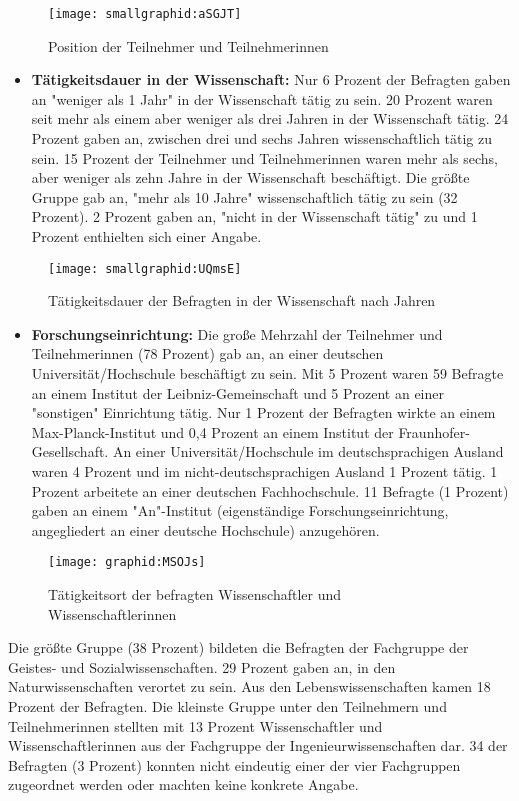 \begin{figure}[h!]
\texttt{[image: smallgraphid:aSGJT]}
\caption{Position der Teilnehmer und Teilnehmerinnen}
\end{figure}

\begin{itemize}
\item \textbf{Tätigkeitsdauer in der Wissenschaft:} Nur 6 Prozent der Befragten gaben an "weniger als 1 Jahr" in der Wissenschaft tätig zu sein. 20 Prozent waren seit mehr als einem aber weniger als drei Jahren in der Wissenschaft tätig. 24 Prozent gaben an, zwischen drei und sechs Jahren wissenschaftlich tätig zu sein. 15 Prozent der Teilnehmer und Teilnehmerinnen waren mehr als sechs, aber weniger als zehn Jahre in der Wissenschaft beschäftigt. Die größte Gruppe gab an, "mehr als 10 Jahre" wissenschaftlich tätig zu sein (32 Prozent). 2 Prozent gaben an, "nicht in der Wissenschaft tätig" zu und 1 Prozent enthielten sich einer Angabe.
\end{itemize}

\begin{figure}[h!]
\texttt{[image: smallgraphid:UQmsE]}
\caption{Tätigkeitsdauer der Befragten in der Wissenschaft nach Jahren}
\end{figure}

\begin{itemize}
\item \textbf{Forschungseinrichtung:} Die große Mehrzahl der Teilnehmer und Teilnehmerinnen (78 Prozent) gab an, an einer deutschen Universität/Hochschule beschäftigt zu sein. Mit 5 Prozent waren 59 Befragte an einem Institut der Leibniz-Gemeinschaft und 5 Prozent an einer "sonstigen" Einrichtung tätig. Nur 1 Prozent der Befragten wirkte an einem Max-Planck-Institut und 0,4 Prozent an einem Institut der Fraunhofer-Gesellschaft. An einer Universität/Hochschule im deutschsprachigen Ausland waren 4 Prozent und im nicht-deutschsprachigen Ausland 1 Prozent tätig. 1 Prozent arbeitete an einer deutschen Fachhochschule. 11 Befragte (1 Prozent) gaben an einem "An"-Institut (eigenständige Forschungseinrichtung, angegliedert an einer deutsche Hochschule) anzugehören.
\end{itemize}

\begin{figure}[h!]
\texttt{[image: graphid:MSOJs]}
\caption{Tätigkeitsort der befragten Wissenschaftler und Wissenschaftlerinnen}
\end{figure}

Die größte Gruppe (38 Prozent) bildeten die Befragten der Fachgruppe der Geistes- und Sozialwissenschaften. 29 Prozent gaben an, in den Naturwissenschaften verortet zu sein. Aus den Lebenswissenschaften kamen 18 Prozent der Befragten. Die kleinste Gruppe unter den Teilnehmern und Teilnehmerinnen stellten mit 13 Prozent Wissenschaftler und Wissenschaftlerinnen aus der Fachgruppe der Ingenieurwissenschaften dar. 34 der Befragten (3 Prozent) konnten nicht eindeutig einer der vier Fachgruppen zugeordnet werden oder machten keine konkrete Angabe.

